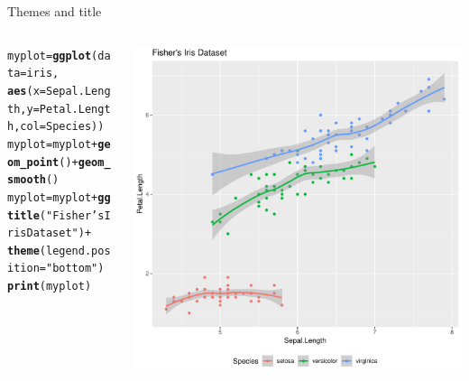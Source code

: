 \documentclass[aspectratio=169]{beamer}\usepackage[]{graphicx}\usepackage[]{color}
\makeatletter
\def\maxwidth{ %
  \ifdim\Gin@nat@width>\linewidth
    \linewidth
  \else
    \Gin@nat@width
  \fi
}
\newcommand{\hlstr}[1]{\textcolor[rgb]{0.192,0.494,0.8}{#1}}%
\newcommand{\hlopt}[1]{\textcolor[rgb]{0,0,0}{#1}}%
\newcommand{\hlstd}[1]{\textcolor[rgb]{0.345,0.345,0.345}{#1}}%
\newcommand{\hlkwb}[1]{\textcolor[rgb]{0.69,0.353,0.396}{#1}}%
\newcommand{\hlkwc}[1]{\textcolor[rgb]{0.333,0.667,0.333}{#1}}%
\newcommand{\hlkwd}[1]{\textcolor[rgb]{0.737,0.353,0.396}{\textbf{#1}}}%
\newenvironment{kframe}{%
 \def\at@end@of@kframe{}%
 \ifinner\ifhmode%
  \def\at@end@of@kframe{\end{minipage}}%
  \begin{minipage}{\columnwidth}%
 \fi\fi%
 \def\FrameCommand##1{\hskip\@totalleftmargin \hskip-\fboxsep
 \colorbox{shadecolor}{##1}\hskip-\fboxsep
     \hskip-\linewidth \hskip-\@totalleftmargin \hskip\columnwidth}%
 \MakeFramed {\advance\hsize-\width
   \@totalleftmargin\z@ \linewidth\hsize
   \@setminipage}}%
 {\par\unskip\endMakeFramed%
 \at@end@of@kframe}
\newenvironment{knitrout}{}{} %
\makeatother
\begin{document}
\begin{frame}[fragile]{Themes and title}
\begin{columns}
  \begin{column}{0.50\textwidth}
\begin{knitrout}\tiny
{}\color{fgcolor}\begin{kframe}
\begin{alltt}
\hlstd{myplot} \hlkwb{=} \hlkwd{ggplot}\hlstd{(}\hlkwc{data}\hlstd{=iris,}
                \hlkwd{aes}\hlstd{(}\hlkwc{x}\hlstd{=Sepal.Length,} \hlkwc{y}\hlstd{=Petal.Length,} \hlkwc{col}\hlstd{=Species))}
\hlstd{myplot} \hlkwb{=} \hlstd{myplot} \hlopt{+} \hlkwd{geom_point}\hlstd{()} \hlopt{+} \hlkwd{geom_smooth}\hlstd{()}
\hlstd{myplot} \hlkwb{=} \hlstd{myplot} \hlopt{+} \hlkwd{ggtitle}\hlstd{(}\hlstr{"Fisher's Iris Dataset"}\hlstd{)} \hlopt{+}
  \hlkwd{theme}\hlstd{(}\hlkwc{legend.position}\hlstd{=}\hlstr{"bottom"}\hlstd{)}
\hlkwd{print}\hlstd{(myplot)}
\end{alltt}
\end{kframe}
\end{knitrout}
  \end{column}
  \begin{column}{0.5\textwidth}
\begin{knitrout}\scriptsize
{}\color{fgcolor}
\includegraphics[width=\maxwidth]{figure/unnamed-chunk-11-1} 

\end{knitrout}
  \end{column}
\end{columns}
\end{frame}
\end{document}
